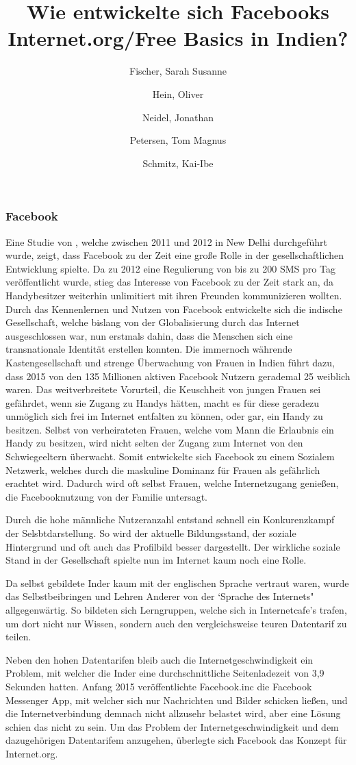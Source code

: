 \documentclass{article}
\title{Wie entwickelte sich Facebooks Internet.org/Free Basics in Indien?}
\author{
  Fischer, Sarah Susanne\\
  \and
  Hein, Oliver\\
  \and
  Neidel, Jonathan\\
  \and
  Petersen, Tom Magnus\\
  \and
  Schmitz, Kai-Ibe\\
}
\begin{document}
\maketitle
\subsubsection {Facebook}
Eine Studie von \textcite{empowermentThroughFacebook}, welche zwischen 2011 und 2012 in New Delhi durchgeführt wurde, zeigt, dass Facebook zu der Zeit eine große Rolle in der gesellschaftlichen Entwicklung spielte. 
\medskip
Da zu 2012 eine Regulierung von bis zu 200 SMS pro Tag veröffentlicht wurde\autocite{PressInformation}, stieg das Interesse von Facebook zu der Zeit stark an,
da Handybesitzer weiterhin unlimitiert mit ihren Freunden kommunizieren wollten.
Durch das Kennenlernen und Nutzen von Facebook entwickelte sich die indische Gesellschaft, welche bislang von der Globalisierung durch das Internet ausgeschlossen war, nun erstmals dahin, dass die Menschen sich eine transnationale Identität erstellen konnten.
\medskip
Die immernoch währende Kastengesellschaft und strenge Überwachung von Frauen in Indien führt dazu, dass 2015 von den 135 Millionen aktiven Facebook Nutzern gerademal 25 weiblich waren. 
Das weitverbreitete Vorurteil, die Keuschheit von jungen Frauen sei gefährdet, wenn sie Zugang zu Handys hätten, macht es für diese geradezu unmöglich sich frei im Internet entfalten zu können, oder gar, ein Handy zu besitzen. Selbst von verheirateten Frauen, welche vom Mann die Erlaubnis ein Handy zu besitzen, wird nicht selten der Zugang zum Internet von den Schwiegeeltern überwacht.
Somit entwickelte sich Facebook zu einem Sozialem Netzwerk, welches durch die maskuline Dominanz für Frauen als gefährlich erachtet wird. Dadurch wird oft selbst Frauen, welche Internetzugang genießen, die Facebooknutzung von der Familie untersagt. 


Durch die hohe männliche Nutzeranzahl entstand schnell ein Konkurenzkampf der Selsbtdarstellung. So wird der aktuelle Bildungsstand, der soziale Hintergrund und oft auch das Profilbild besser dargestellt. Der wirkliche soziale Stand in der Gesellschaft spielte nun im Internet kaum noch eine Rolle.

Da selbst gebildete Inder kaum mit der englischen Sprache vertraut waren, wurde das Selbstbeibringen und Lehren Anderer von der `Sprache des Internets" allgegenwärtig. So bildeten sich Lerngruppen, welche sich in Internetcafe's trafen, um dort nicht nur Wissen, sondern auch den vergleichsweise teuren Datentarif zu teilen.


Neben den hohen Datentarifen bleib auch die Internetgeschwindigkeit ein Problem, mit welcher die Inder eine durchschnittliche Seitenladezeit von 3,9 Sekunden hatten\autocite{mashable}. Anfang 2015 veröffentlichte Facebook.inc die Facebook Messenger App, mit welcher sich nur Nachrichten und Bilder schicken ließen, und die Internetverbindung demnach nicht allzusehr belastet wird, aber eine Lösung schien das nicht zu sein. 
\medskip
Um das Problem der Internetgeschwindigkeit und dem dazugehörigen Datentarifem anzugehen, überlegte sich Facebook das Konzept für Internet.org.



\end{document}
